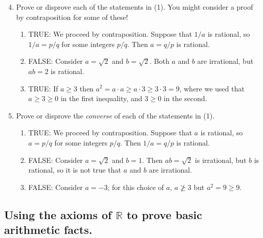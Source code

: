 \documentclass[12pt]{amsart}
\newcommand{\R}{{\mathbb{R}}}
\numberwithin{equation}{section}
\theoremstyle{plain} %
\theoremstyle{definition}
\theoremstyle{remark}
\begin{document}
\begin{enumerate}\setcounter{enumi}{3}

\item Prove or disprove each of the statements in (1). You might consider a proof by contraposition for some of these!

\begin{framed}
\begin{enumerate}
\item TRUE: We proceed by contraposition. Suppose that $1/a$ is rational, so $1/a=p/q$ for some integers $p/q$. Then $a=q/p$ is rational.
\item FALSE: Consider $a=\sqrt{2}$ and $b=\sqrt{2}$. Both $a$ and $b$ are irrational, but $ab=2$ is rational.
\item TRUE: If $a\geq 3$ then $a^2 = a \cdot a \geq a \cdot 3 \geq 3 \cdot 3 = 9$, where we used that $a\geq 3 \geq 0$ in the first inequality, and $3\geq 0$ in the second.
\end{enumerate}
\end{framed}



\item Prove or disprove the \emph{converse} of each of the statements in (1).

\begin{framed}
\begin{enumerate}
\item TRUE: We proceed by contraposition. Suppose that $a$ is rational, so $a=p/q$ for some integers $p/q$. Then $1/a=q/p$ is rational.
\item FALSE: Consider $a=\sqrt{2}$ and $b=1$. Then $ab=\sqrt{2}$ is irrational, but $b$ is rational, so it is not true that $a$ and $b$ are irrational.
\item FALSE: Consider $a=-3$; for this choice of $a$, $a\not\geq 3$ but $a^2=9\geq 9$.
\end{enumerate}
\end{framed}


\end{enumerate}



\subsection*{Using the axioms of $\R$ to prove basic arithmetic facts.}
\end{document}
